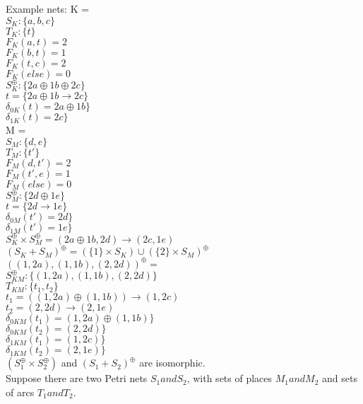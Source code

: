 \newpage
Example nets:
%
K = \\
$S_K :\{ a, b, c\}$\\
$T_K :\{t\}$\\  
$F_K (a, t) = 2$\\
$F_K (b, t) = 1$\\
$F_K (t, c) = 2$\\
$F_K (else) = 0$\\
%
$S_K^\oplus :\{ 2a \oplus 1b \oplus 2c\}$\\
$t = \{ 2a \oplus 1b \to 2c \}$\\  
$\delta_{0K} (t) = 2a \oplus 1b \}$\\
$\delta_{1K} (t) = 2c \}$\\
\smallskip
M = \\
$S_M :\{d,e\}$\\
$T_M :\{t'\}$\\  
$F_M (d, t') = 2$\\
$F_M (t', e) = 1$\\
$F_M (else) = 0$\\
%
$S_M^\oplus :\{ 2d \oplus 1e\}$\\
$t = \{ 2d \to 1e \}$\\  
$\delta_{0M} (t') = 2d \}$\\
$\delta_{1M} (t') = 1e \}$\\
\smallskip
$S_K^\oplus \times S_M^\oplus = (2a \oplus 1b, 2d) \to (2c, 1e)$\\
\smallskip
$(S_K + S_M)^\oplus = (\{1\} \times S_K) \cup (\{2\} \times S_M)^\oplus$\\
$((1, 2a), (1, 1b), (2, 2d))^\oplus = $\\
$S_{KM}^\oplus: \{(1, 2a), (1, 1b), (2, 2d) \}$\\
$T_{KM}: \{t_1, t_2\}$\\
$t_1 = ((1, 2a) \oplus (1, 1b)) \to (1, 2c)$\\
$t_2 = (2, 2d) \to (2, 1e)$\\
$\delta_{0KM} (t_1) = (1, 2a) \oplus (1, 1b) \}$\\
$\delta_{0KM} (t_2) = (2, 2d) \}$\\
$\delta_{1KM} (t_1) = (1, 2c) \}$\\
$\delta_{1KM} (t_2) = (2, 1e) \}$\\
\smallskip
$(S_1 ^\oplus \times S_2 ^\oplus)$ and $(S_1 + S_2)^\oplus$ are isomorphic. \\
Suppose there are two Petri nets $S_1 and S_2$, with sets of places $M_1 and M_2$ and sets of arcs $T_1 and T_2.$\\
